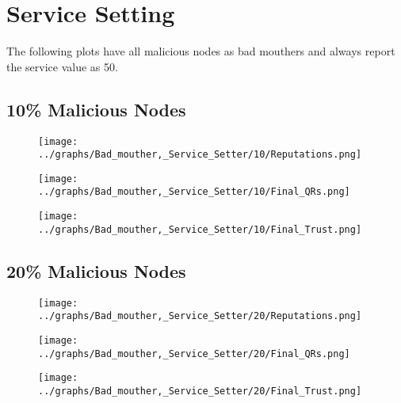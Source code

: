\documentclass{article}
\begin{document}
    \section*{Service Setting}
    The following plots have all malicious nodes as bad mouthers and always
    report the service value as 50.
    \\
  \begin{minipage}[t]{0.49\columnwidth}
    \subsection*{10\% Malicious Nodes}
        \begin{figure}[H]
            \centering
            \texttt{[image: ../graphs/Bad\_mouther,\_Service\_Setter/10/Reputations.png]}
        \end{figure}
        \begin{figure}[H]
            \centering
            \texttt{[image: ../graphs/Bad\_mouther,\_Service\_Setter/10/Final\_QRs.png]}
        \end{figure}
    \end{minipage}
    \begin{minipage}[t]{0.49\columnwidth}
        \begin{figure}[H]
            \centering
            \texttt{[image: ../graphs/Bad\_mouther,\_Service\_Setter/10/Final\_Trust.png]}
        \end{figure}
    \end{minipage}

  \begin{minipage}[t]{0.49\columnwidth}
    \subsection*{20\% Malicious Nodes}
        \begin{figure}[H]
            \centering
            \texttt{[image: ../graphs/Bad\_mouther,\_Service\_Setter/20/Reputations.png]}
        \end{figure}
        \begin{figure}[H]
            \centering
            \texttt{[image: ../graphs/Bad\_mouther,\_Service\_Setter/20/Final\_QRs.png]}
        \end{figure}
    \end{minipage}
    \begin{minipage}[t]{0.49\columnwidth}
        \begin{figure}[H]
            \centering
            \texttt{[image: ../graphs/Bad\_mouther,\_Service\_Setter/20/Final\_Trust.png]}
        \end{figure}
    \end{minipage}
\end{document}
